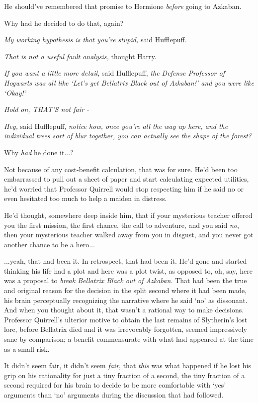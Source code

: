 He should've remembered that promise to Hermione \emph{before} going to Azkaban.

Why had he decided to do that, again?

\emph{My working hypothesis is that you're stupid,} said Hufflepuff.

\emph{That is not a useful fault analysis,} thought Harry.

\emph{If you want a little more detail,} said Hufflepuff, \emph{the Defense Professor of Hogwarts was all like `Let's get Bellatrix Black out of Azkaban!' and you were like `Okay!'}

\emph{Hold on, THAT'S not fair -}

\emph{Hey,} said Hufflepuff, \emph{notice how, once you're all the way up here, and the individual trees sort of blur together, you can actually see the shape of the forest?}

Why \emph{had} he done it...?

Not because of any cost-benefit calculation, that was for sure. He'd been too embarrassed to pull out a sheet of paper and start calculating expected utilities, he'd worried that Professor Quirrell would stop respecting him if he said no or even hesitated too much to help a maiden in distress.

He'd thought, somewhere deep inside him, that if your mysterious teacher offered you the first mission, the first chance, the call to adventure, and you said \emph{no}, then your mysterious teacher walked away from you in disgust, and you never got another chance to be a hero...

...yeah, that had been it. In retrospect, that had been it. He'd gone and started thinking his life had a plot and here was a plot twist, as opposed to, oh, say, here was a proposal to \emph{break Bellatrix Black out of Azkaban.} That had been the true and original reason for the decision in the split second where it had been made, his brain perceptually recognizing the narrative where he said `no' as dissonant. And when you thought about it, that wasn't a rational way to make decisions. Professor Quirrell's ulterior motive to obtain the last remains of Slytherin's lost lore, before Bellatrix died and it was irrevocably forgotten, seemed impressively sane by comparison; a benefit commensurate with what had appeared at the time as a small risk.

It didn't seem fair, it didn't seem \emph{fair}, that \emph{this} was what happened if he lost his grip on his rationality for just a tiny fraction of a second, the tiny fraction of a second required for his brain to decide to be more comfortable with `yes' arguments than `no' arguments during the discussion that had followed.

